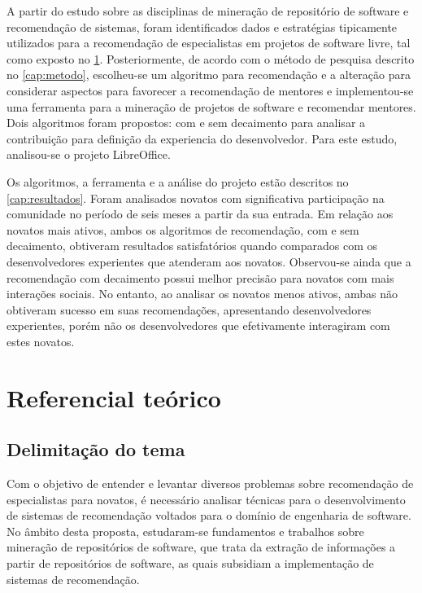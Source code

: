 \documentclass[oneside,brazil,a4paper]{normas-utf-tex}
\begin{document}
A partir do estudo sobre as disciplinas de mineração de repositório de software e recomendação de sistemas, foram identificados dados e estratégias tipicamente utilizados para a recomendação de especialistas em projetos de software livre, tal como exposto no \cref{cap:teoria}. Posteriormente, de acordo com o método de pesquisa descrito no \cref{cap:metodo}, escolheu-se um algoritmo para recomendação e a alteração para considerar aspectos  para favorecer a recomendação de mentores e implementou-se uma ferramenta para a mineração de projetos de software e recomendar mentores. Dois algoritmos foram propostos: com e sem decaimento para analisar a  contribuição para definição da experiencia do desenvolvedor. Para este estudo, analisou-se o projeto LibreOffice. 

Os algoritmos, a ferramenta e a análise do projeto estão descritos no \cref{cap:resultados}. Foram analisados novatos com significativa participação na comunidade no período de seis meses a partir da sua entrada. Em relação aos novatos mais ativos, ambos os algoritmos de recomendação, com e sem decaimento, obtiveram resultados satisfatórios quando comparados com os desenvolvedores experientes que atenderam aos novatos. Observou-se ainda que a recomendação com decaimento possui melhor precisão para novatos com mais interações sociais. No entanto, ao analisar os novatos menos ativos, ambas não obtiveram sucesso em suas recomendações, apresentando desenvolvedores experientes, porém não os desenvolvedores que efetivamente interagiram com estes novatos.



\chapter{Referencial teórico}
\label{cap:teoria}

\section{Delimitação do tema}
\label{sect:tema}

Com o objetivo de entender e levantar diversos problemas sobre recomendação de especialistas para novatos, é necessário analisar técnicas para o desenvolvimento de sistemas de recomendação voltados para o domínio de engenharia de software. No âmbito desta proposta, estudaram-se fundamentos e trabalhos sobre mineração de repositórios de software, que trata da extração de informações a partir de repositórios de software, as quais subsidiam a implementação de sistemas de recomendação. 
\end{document}
